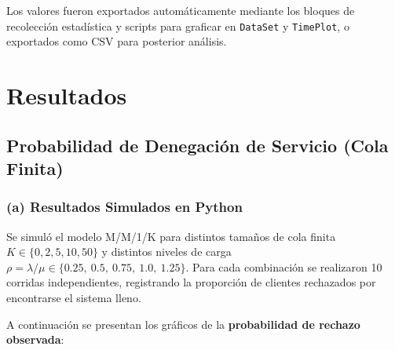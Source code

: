 \documentclass[12pt]{article}
\begin{document}
\begin{itemize}
    Los valores fueron exportados automáticamente mediante los bloques de recolección estadística y scripts para graficar en \texttt{DataSet} y \texttt{TimePlot}, o exportados como CSV para posterior análisis.
\end{itemize}

\section{Resultados}

\subsection{Probabilidad de Denegación de Servicio (Cola Finita)}

\subsubsection*{(a) Resultados Simulados en Python}

Se simuló el modelo M/M/1/K para distintos tamaños de cola finita \( K \in \{0, 2, 5, 10, 50\} \) y distintos niveles de carga \( \rho = \lambda / \mu \in \{0.25,\ 0.5,\ 0.75,\ 1.0,\ 1.25\} \).  
Para cada combinación se realizaron 10 corridas independientes, registrando la proporción de clientes rechazados por encontrarse el sistema lleno.

A continuación se presentan los gráficos de la \textbf{probabilidad de rechazo observada}:
\end{document}
